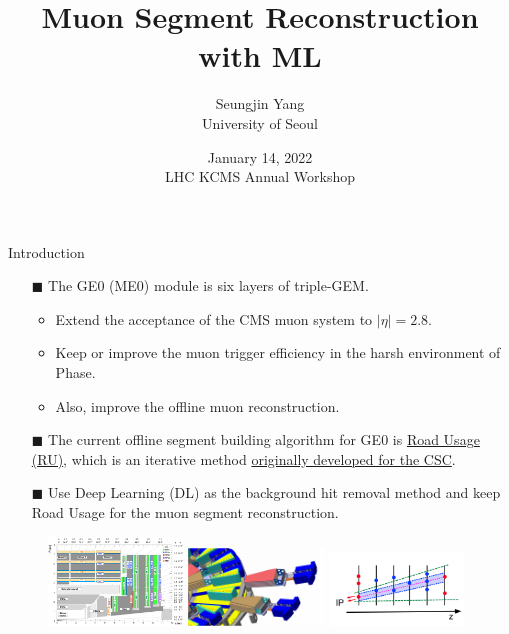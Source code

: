 \documentclass[10pt]{beamer}
\title{Muon Segment Reconstruction with ML}
\author{
    Seungjin Yang \\
    University of Seoul %
}
\date{
    January 14, 2022 \\
    LHC KCMS Annual Workshop 
}
\newcommand{\PhaseII}{Phase{\uppercase\expandafter\romannumeral 2}}
\newcommand{\TODO}{{\color{red} \textbf{TODO}}}
\begin{document}
\begin{frame}
    \maketitle
\end{frame}


\begin{frame}[fragile]{Introduction}
\begin{itemize}
    \item[$\blacksquare$] The GE0 (ME0) module is six layers of triple-GEM.
    \begin{itemize}
        \item Extend the acceptance of the CMS muon system to $\vert\eta\vert=2.8$.
        \item Keep or improve the muon trigger efficiency in the harsh environment of \PhaseII.
        \item Also, improve the offline muon reconstruction.
    \end{itemize}
    \item[$\blacksquare$] The current offline segment building algorithm for GE0 is \href{https://github.com/cms-sw/cmssw/blob/master/RecoLocalMuon/GEMSegment/plugins/GE0SegAlgoRU.h}{Road Usage (RU)}, which is an iterative method \href{https://www.epj-conferences.org/articles/epjconf/pdf/2016/03/epjconf_mmcp2016_02023.pdf}{originally developed for the CSC}.%
    \item[$\blacksquare$] Use Deep Learning (DL) as the background hit removal method and keep Road Usage for the muon segment reconstruction.
\end{itemize}

\begin{figure}
    \centering
    \includegraphics[width=0.32\textwidth]{figures/detector/detectorplacement1.pdf}
    \includegraphics[width=0.32\textwidth]{figures/detector/3D-drawing-of-the-insertion-of-two-adjacent-stacks-of-six-ME0-modules-into-the-end-cap.ppm.png}
    \href{https://www.epj-conferences.org/articles/epjconf/pdf/2019/19/epjconf_chep2018_02014.pdf}{\includegraphics[width=0.32\textwidth]{figures/RU/Schematic-illustration.png}}
\end{figure}


\end{frame}
\end{document}
